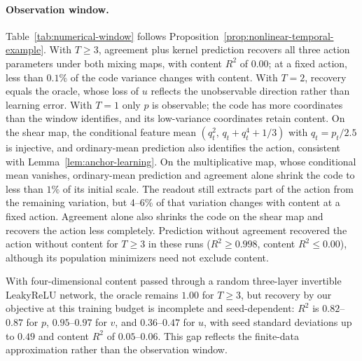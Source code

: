 \paragraph{Observation window.}
Table~\ref{tab:numerical-window} follows
Proposition~\ref{prop:nonlinear-temporal-example}. With $T\geq3$, agreement
plus kernel prediction recovers all three action parameters under both
mixing maps, with content $R^2$ of $0.00$; at a fixed action, less than
$0.1\%$ of the code variance changes with content. With $T=2$, recovery
equals the oracle, whose loss of $u$ reflects the unobservable direction
rather than learning error. With $T=1$ only $p$ is observable; the code has
more coordinates than the window identifies, and its low-variance
coordinates retain content. On the shear map, the conditional feature mean
$(q_t^2,\,q_t+q_t^4+1/3)$ with $q_t=p_t/2.5$ is injective, and ordinary-mean
prediction also identifies the action, consistent with
Lemma~\ref{lem:anchor-learning}. On the multiplicative map, whose
conditional mean vanishes, ordinary-mean prediction and agreement alone
shrink the code to less than $1\%$ of its initial scale. The readout still
extracts part of the action from the remaining variation, but 4--6\% of
that variation changes with content at a fixed action. Agreement alone
also shrinks the code on the shear map and recovers the action less
completely. Prediction without agreement recovered the action without
content for $T\geq3$ in these runs ($R^2\geq0.998$, content $R^2\leq0.00$),
although its population minimizers need not exclude content.

With four-dimensional content passed through a random three-layer
invertible LeakyReLU network, the oracle remains $1.00$ for $T\geq3$, but
recovery by our objective at this training budget is incomplete and
seed-dependent: $R^2$ is $0.82$--$0.87$ for $p$, $0.95$--$0.97$ for $v$, and
$0.36$--$0.47$ for $u$, with seed standard deviations up to $0.49$ and
content $R^2$ of $0.05$--$0.06$. This gap reflects the finite-data approximation
rather than the observation window.

